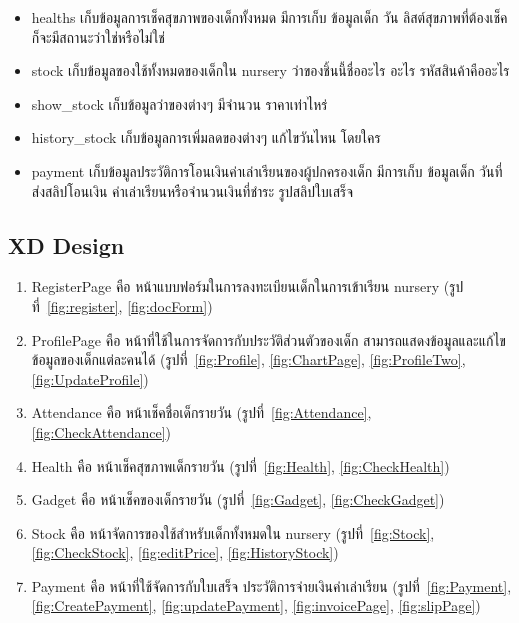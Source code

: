 \begin{itemize}
    \item healths เก็บข้อมูลการเช็คสุขภาพของเด็กทั้งหมด มีการเก็บ ข้อมูลเด็ก วัน ลิสต์สุขภาพที่ต้องเช็ค ก็จะมีสถานะว่าใช่หรือไม่ใช่
    \item stock เก็บข้อมูลของใช้ทั้งหมดของเด็กใน nursery ว่าของชิ้นนี้ชื่ออะไร อะไร รหัสสินค้าคืออะไร
    \item show\_stock เก็บข้อมูลว่าของต่างๆ มีจำนวน ราคาเท่าไหร่
    \item history\_stock เก็บข้อมูลการเพิ่มลดของต่างๆ  แก้ไขวันไหน โดยใคร
    \item payment เก็บข้อมูลประวัติการโอนเงินค่าเล่าเรียนของผู้ปกครองเด็ก มีการเก็บ ข้อมูลเด็ก วันที่ส่งสลิปโอนเงิน ค่าเล่าเรียนหรือจำนวนเงินที่ชำระ รูปสลิปใบเสร็จ 
  \end{itemize}

\subsection{XD Design}

\begin{enumerate}
  \item RegisterPage คือ หน้าแบบฟอร์มในการลงทะเบียนเด็กในการเข้าเรียน nursery (รูปที่~\ref{fig:register}, \ref{fig:docForm})
  \item  ProfilePage คือ หน้าที่ใช้ในการจัดการกับประวัติส่วนตัวของเด็ก สามารถแสดงข้อมูลและแก้ไขข้อมูลของเด็กแต่ละคนได้ (รูปที่~\ref{fig:Profile}, \ref{fig:ChartPage}, \ref{fig:ProfileTwo}, \ref{fig:UpdateProfile})
  \item  Attendance คือ หน้าเช็คชื่อเด็กรายวัน (รูปที่~\ref{fig:Attendance}, \ref{fig:CheckAttendance})
  \item  Health คือ หน้าเช็คสุขภาพเด็กรายวัน (รูปที่~\ref{fig:Health}, \ref{fig:CheckHealth}) 
  \item  Gadget คือ หน้าเช็คของเด็กรายวัน (รูปที่~\ref{fig:Gadget}, \ref{fig:CheckGadget}) 
  \item  Stock คือ หน้าจัดการของใช้สำหรับเด็กทั้งหมดใน nursery (รูปที่~\ref{fig:Stock}, \ref{fig:CheckStock}, \ref{fig:editPrice}, \ref{fig:HistoryStock}) 
  \item  Payment คือ หน้าที่ใช้จัดการกับใบเสร็จ ประวัติการจ่ายเงินค่าเล่าเรียน (รูปที่~\ref{fig:Payment}, \ref{fig:CreatePayment}, \ref{fig:updatePayment}, \ref{fig:invoicePage}, \ref{fig:slipPage}) 
\end{enumerate}

